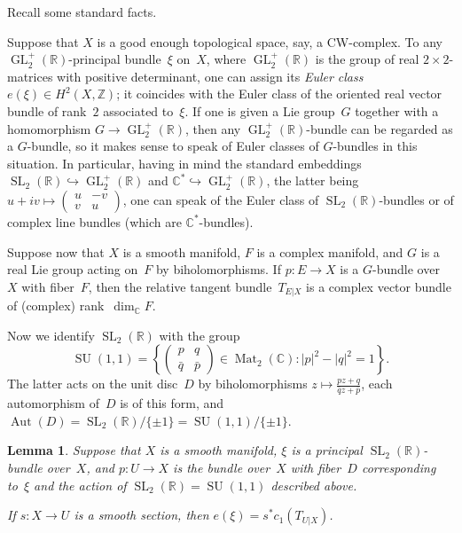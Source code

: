 \documentclass[11pt]{amsart}
\newcommand*{\C}{{\mathbb C}}
\newcommand*{\R}{{\mathbb R}}
\newcommand*{\Z}{{\mathbb Z}}
\DeclareMathOperator{\Aut}{Aut}
\DeclareMathOperator{\GL}{GL}
\DeclareMathOperator{\Mat}{Mat}
\DeclareMathOperator{\SL}{SL}
\DeclareMathOperator{\SU}{SU}
\newtheorem{lemma}[proposition]{Lemma}
\theoremstyle{remark}
\theoremstyle{definition}
\begin{document}
Recall some standard facts.

Suppose that $X$ is a good enough topological space, say, a
CW-complex.  To any $\GL_2^+(\R)$-principal bundle~$\xi$ on~$X$, where
$\GL_2^+(\R)$ is the group of real $2\times2$-matrices with positive
determinant, one can assign its \emph{Euler class} $e(\xi)\in
H^2(X,\Z)$; it coincides with the Euler class of the oriented real
vector bundle of rank~$2$ associated to~$\xi$. If one is given a Lie
group~$G$ together with a homomorphism $G\to\GL_2^+(\R)$, then any
$\GL_2^+(\R)$-bundle can be regarded as a $G$-bundle, so it makes
sense to speak of Euler classes of $G$-bundles in this situation. In
particular, having in mind the standard embeddings
$\SL_2(\R)\hookrightarrow \GL_2^+(\R)$ and $\C^*\hookrightarrow
\GL_2^+(\R)$, the latter being $u+iv\mapsto \left(
\begin{smallmatrix}u&-v\\ v&u  \end{smallmatrix}\right)$,
one can speak of the Euler class of $\SL_2(\R)$-bundles or
of complex line bundles (which are $\C^*$-bundles).

Suppose now that $X$ is a smooth manifold, $F$ is a complex manifold, and
$G$ is a real Lie group acting on~$F$ by biholomorphisms. If $p\colon
E\to X$ is a $G$-bundle over~$X$ with fiber~$F$, then the
relative tangent bundle~$T_{E|X}$ is a complex
vector bundle of (complex) rank~$\dim_\C F$.

Now we identify $\SL_2(\R)$ with the
group
\begin{equation*}
  \SU(1,1)=\left\{
  \begin{pmatrix}
    p& q\\ \bar q&\bar p
  \end{pmatrix}
\in \Mat_2(\C)\colon |p|^2-|q|^2=1
  \right\}.
\end{equation*}
The latter acts on the unit disc~$D$ by
biholomorphisms
$z\mapsto \frac{pz+q}{\bar q z+\bar p}$,
each automorphism of~$D$ is of this form, and
$\Aut(D)=\SL_2(\R)/\{\pm1\}=\SU(1,1)/\{\pm1\}$. 

\begin{lemma}\label{ghnm}
Suppose that $X$ is a smooth manifold, $\xi$ is a principal
$\SL_2(\R)$-bundle over~$X$, and $p\colon U\to X$ is the bundle
over~$X$ with fiber~$D$ 
corresponding to~$\xi$ and the action of $\SL_2(\R)=\SU(1,1)$
described above.

If $s\colon X\to U$ is a smooth section, then
$e(\xi)=s^*c_1(T_{U|X})$. 
\end{lemma}
\end{document}
